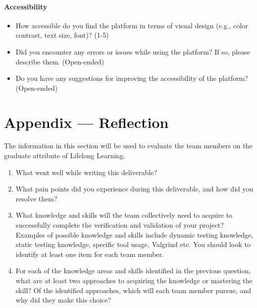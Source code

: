 \documentclass[12pt, titlepage]{article}
\begin{document}
\paragraph{Accessibility}
\begin{itemize}
\item{How accessible do you find the platform in terms of visual design (e.g., color contrast, text size, font)? (1-5)}
\item{Did you encounter any errors or issues while using the platform? If so, please describe them. (Open-ended)}
\item{Do you have any suggestions for improving the accessibility of the platform?
(Open-ended)}
\end{itemize}

\newpage{}
\section*{Appendix --- Reflection}


The information in this section will be used to evaluate the team members on the
graduate attribute of Lifelong Learning.



\begin{enumerate}
  \item What went well while writing this deliverable? 
  \item What pain points did you experience during this deliverable, and how
    did you resolve them?
  \item What knowledge and skills will the team collectively need to acquire to
  successfully complete the verification and validation of your project?
  Examples of possible knowledge and skills include dynamic testing knowledge,
  static testing knowledge, specific tool usage, Valgrind etc.  You should look to
  identify at least one item for each team member.
  \item For each of the knowledge areas and skills identified in the previous
  question, what are at least two approaches to acquiring the knowledge or
  mastering the skill?  Of the identified approaches, which will each team
  member pursue, and why did they make this choice?
\end{enumerate}
\end{document}
